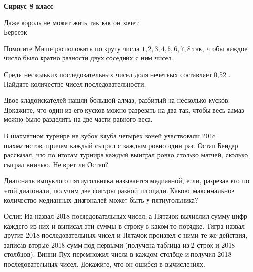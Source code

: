 \centerline{\bf \Huge Сириус 8 класс}

\begin{flushright}
        \scriptsize{Даже король не может жить так как он хочет\\ Берсерк}
\end{flushright}

Помогите Мише расположить по кругу числа $1,2,3,4,5,6,7,8$ так, чтобы каждое число было кратно разности двух соседних с ним чисел.

Среди нескольких последовательных чисел доля нечетных составляет 0,52 . Найдите количество чисел последовательности.

Двое кладоискателей нашли большой алмаз, разбитый на несколько кусков. Докажите, что один из его кусков можно разрезать на два так, чтобы весь алмаз можно было разделить на две части равного веса.

В шахматном турнире на кубок клуба четырех коней участвовали 2018 шахматистов, причем каждый сыграл с каждым ровно один раз. Остап Бендер рассказал, что по итогам турнира каждый выиграл ровно столько матчей, сколько сыграл вничью. Не врет ли Остап?

Диагональ выпуклого пятиугольника называется медианной, если, разрезав его по этой диагонали, получим две фигуры равной площади. Каково максимальное количество медианных диагоналей может быть у пятиугольника?

Ослик Иа назвал 2018 последовательных чисел, а Пятачок вычислил сумму цифр каждого из них и выписал эти суммы в строку в каком-то порядке. Тигра назвал другие 2018 последовательных чисел и Пятачок произвел с ними те же действия, записав вторые 2018 сумм под первыми (получена таблица из 2 строк и 2018 столбцов). Винни Пух перемножил числа в каждом столбце и получил 2018 последовательных чисел. Докажите, что он ошибся в вычислениях.